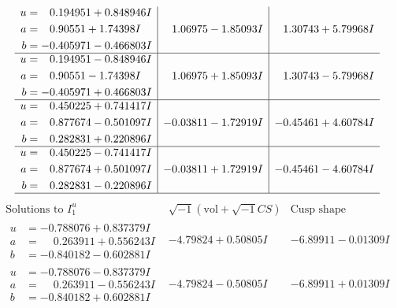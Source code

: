 \documentclass[1p]{elsarticle_modified}
\theoremstyle{definition}
\newcommand{\I}{\sqrt{-1}}
\begin{document}
$$\begin{array}{c|c|c}
\begin{aligned}
u &= \phantom{-}0.194951 + 0.848946 I \\
a &= \phantom{-}0.90551 + 1.74398 I \\
b &= -0.405971 - 0.466803 I\end{aligned}
 & \phantom{-}1.06975 - 1.85093 I & \phantom{-}1.30743 + 5.79968 I \\ \hline\begin{aligned}
u &= \phantom{-}0.194951 - 0.848946 I \\
a &= \phantom{-}0.90551 - 1.74398 I \\
b &= -0.405971 + 0.466803 I\end{aligned}
 & \phantom{-}1.06975 + 1.85093 I & \phantom{-}1.30743 - 5.79968 I \\ \hline\begin{aligned}
u &= \phantom{-}0.450225 + 0.741417 I \\
a &= \phantom{-}0.877674 - 0.501097 I \\
b &= \phantom{-}0.282831 + 0.220896 I\end{aligned}
 & -0.03811 - 1.72919 I & -0.45461 + 4.60784 I \\ \hline\begin{aligned}
u &= \phantom{-}0.450225 - 0.741417 I \\
a &= \phantom{-}0.877674 + 0.501097 I \\
b &= \phantom{-}0.282831 - 0.220896 I\end{aligned}
 & -0.03811 + 1.72919 I & -0.45461 - 4.60784 I\\
 \hline 
 \end{array}$$\newpage$$\begin{array}{c|c|c}  
\text{Solutions to }I^u_{1}& \I (\text{vol} + \sqrt{-1}CS) & \text{Cusp shape}\\
 \hline 
\begin{aligned}
u &= -0.788076 + 0.837379 I \\
a &= \phantom{-}0.263911 + 0.556243 I \\
b &= -0.840182 - 0.602881 I\end{aligned}
 & -4.79824 + 0.50805 I & -6.89911 - 0.01309 I \\ \hline\begin{aligned}
u &= -0.788076 - 0.837379 I \\
a &= \phantom{-}0.263911 - 0.556243 I \\
b &= -0.840182 + 0.602881 I\end{aligned}
 & -4.79824 - 0.50805 I & -6.89911 + 0.01309 I \\ \hline\begin{aligned}

\end{aligned}
\end{array}$$
\end{document}
